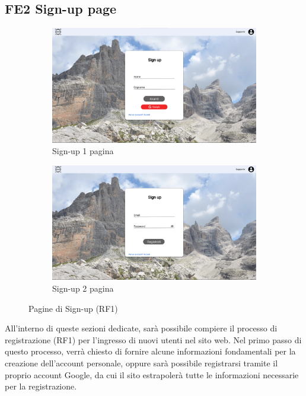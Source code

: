 \documentclass[a4paper,12pt]{article}
\begin{document}
\subsection*{FE2 Sign-up page}
\begin{figure}[H]
  \begin{subfigure}{0.49\textwidth}
    \centering
    \includegraphics[width=\textwidth]{img/Sign-up 1.png} 
    \caption{Sign-up 1 pagina}
  \end{subfigure}
  \hfill %
  \begin{subfigure}{0.49\textwidth}
    \centering
    \includegraphics[width=\textwidth]{img/Sign-up 2.png} 
    \caption{Sign-up 2 pagina}
  \end{subfigure}
  \caption{Pagine di Sign-up (RF1)}
\end{figure}
All'interno di queste sezioni dedicate, sarà possibile compiere il processo di registrazione (RF1) per l'ingresso di nuovi utenti nel sito web. Nel primo passo di questo processo, verrà chiesto di fornire alcune informazioni fondamentali per la creazione dell'account personale, oppure sarà possibile registrarsi tramite il proprio account Google, da cui il sito estrapolerà tutte le informazioni necessarie per la registrazione.
\end{document}
